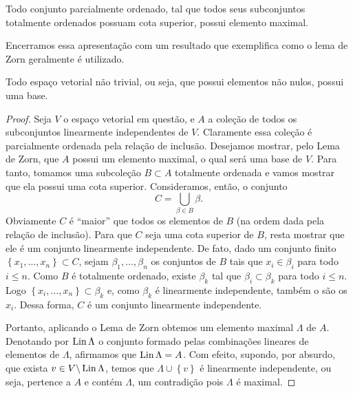 \begin{axiom}
    Todo conjunto parcialmente ordenado, tal que todos seus subconjuntos totalmente ordenados possuam cota superior, possui elemento maximal.
\end{axiom}

Encerramos essa apresentação com um resultado que exemplifica como o lema de Zorn geralmente é utilizado.

\begin{prop}
    Todo espaço vetorial não trivial, ou seja, que possui elementos não nulos, possui uma base.
\end{prop}
\begin{proof}
    Seja \( V \) o espaço vetorial em questão, e \( A \) a coleção de todos os subconjuntos linearmente independentes de \( V \).
    Claramente essa coleção é parcialmente ordenada pela relação de inclusão.
    Desejamos mostrar, pelo Lema de Zorn, que \( A \) possui um elemento maximal, o qual será uma base de \( V \).
    Para tanto, tomamos uma subcoleção \( B \subset A \) totalmente ordenada e vamos mostrar que ela possui uma cota superior.
    Consideramos, então, o conjunto \[
        C = \bigcup_{ \beta \in B } \beta
    .\]
    Obviamente \( C \) é ``maior'' que todos os elementos de \( B \) (na ordem dada pela relação de inclusão).
    Para que \( C \) seja uma cota superior de \( B \), resta mostrar que ele é um conjunto linearmente independente.
    De fato, dado um conjunto finito \( \left\{ x_{ 1 }, \dots, x_{ n } \right\} \subset C \), sejam \( \beta_{ 1 }, \dots, \beta_{ n } \) os conjuntos de \( B \) tais que \( x_{ i } \in \beta_{ i } \) para todo \( i \leq n \).
    Como \( B \) é totalmente ordenado, existe \( \beta_{ k } \) tal que \( \beta_{ i } \subset \beta_{ k } \) para todo \( i \leq n \).
    Logo \( \left\{ x_{ i }, \dots, x_{ n } \right\} \subset  \beta_{ k } \) e, como \( \beta_{ k } \) é linearmente independente, também o são os \( x_{ i } \).
    Dessa forma, \( C \) é um conjunto linearmente independente.

    Portanto, aplicando o Lema de Zorn obtemos um elemento maximal \( \Lambda \) de \( A \).
    Denotando por \( \operatorname{Lin} \Lambda \) o conjunto formado pelas combinações lineares de elementos de \( \Lambda \), afirmamos que \( \operatorname{Lin} \Lambda = A \).
    Com efeito, supondo, por absurdo, que exista \( v \in V \backslash \operatorname{Lin} \Lambda \), temos que \( \Lambda \cup \left\{ v \right\} \) é linearmente independente, ou seja, pertence a \( A \) e contém \( \Lambda \), um contradição pois \( \Lambda \) é maximal.
\end{proof}

